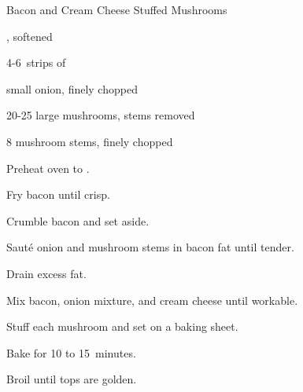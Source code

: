 \begin{recipe}{Bacon and Cream Cheese Stuffed Mushrooms}{}{}

\begin{ingredients}
\item {} , softened
\item 4-6~strips of 
\item small onion, finely chopped
\item 20-25 large mushrooms, stems removed
\item 8 mushroom stems, finely chopped
\end{ingredients}

\begin{directions}
\item Preheat oven to .
\item Fry bacon until crisp.
\item Crumble bacon and set aside.
\item Saut\'e onion and mushroom stems in bacon fat until tender.
\item Drain excess fat.
\item Mix bacon, onion mixture, and cream cheese until workable.
\item Stuff each mushroom and set on a baking sheet.
\item Bake for 10 to 15~minutes.
\item Broil until tops are golden.
\end{directions}

\end{recipe}
